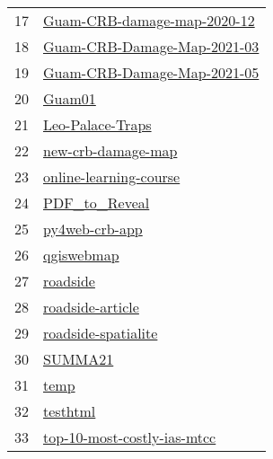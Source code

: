\begin{longtable}{rl}
17 &                   \href{https://github.com/aubreymoore/Guam-CRB-damage-map-2020-12}{Guam-CRB-damage-map-2020-12} \\
18 &                   \href{https://github.com/aubreymoore/Guam-CRB-Damage-Map-2021-03}{Guam-CRB-Damage-Map-2021-03} \\
19 &                   \href{https://github.com/aubreymoore/Guam-CRB-Damage-Map-2021-05}{Guam-CRB-Damage-Map-2021-05} \\
20 &                                                             \href{https://github.com/aubreymoore/Guam01}{Guam01} \\
21 &                                         \href{https://github.com/aubreymoore/Leo-Palace-Traps}{Leo-Palace-Traps} \\
22 &                                     \href{https://github.com/aubreymoore/new-crb-damage-map}{new-crb-damage-map} \\
23 &                             \href{https://github.com/aubreymoore/online-learning-course}{online-learning-course} \\
24 &                                               \href{https://github.com/aubreymoore/PDF_to_Reveal}{PDF\_to\_Reveal} \\
25 &                                             \href{https://github.com/aubreymoore/py4web-crb-app}{py4web-crb-app} \\
26 &                                                     \href{https://github.com/aubreymoore/qgiswebmap}{qgiswebmap} \\
27 &                                                         \href{https://github.com/aubreymoore/roadside}{roadside} \\
28 &                                         \href{https://github.com/aubreymoore/roadside-article}{roadside-article} \\
29 &                                   \href{https://github.com/aubreymoore/roadside-spatialite}{roadside-spatialite} \\
30 &                                                           \href{https://github.com/aubreymoore/SUMMA21}{SUMMA21} \\
31 &                                                                 \href{https://github.com/aubreymoore/temp}{temp} \\
32 &                                                         \href{https://github.com/aubreymoore/testhtml}{testhtml} \\
33 &                   \href{https://github.com/aubreymoore/top-10-most-costly-ias-mtcc}{top-10-most-costly-ias-mtcc} \\

\end{longtable}
